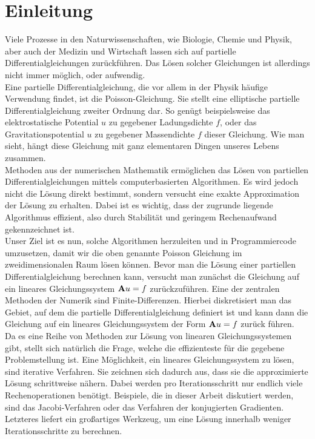\chapter{Einleitung}\label{c.Einleitung}

Viele Prozesse in den Naturwissenschaften, wie Biologie, Chemie und Physik, aber auch der Medizin und Wirtschaft lassen sich auf partielle Differentialgleichungen zurückführen. Das Lösen solcher Gleichungen ist allerdings nicht immer möglich, oder aufwendig. \\
Eine partielle Differentialgleichung, die vor allem in der Physik häufige Verwendung findet, ist die Poisson-Gleichung. Sie stellt eine elliptische partielle Differentialgleichung zweiter Ordnung dar. So genügt beispielsweise das elektrostatische Potential $u$ zu gegebener Ladungsdichte $f$, oder das Gravitationspotential $u$ zu gegebener Massendichte $f$ dieser Gleichung. Wie man sieht, hängt diese Gleichung mit ganz elementaren Dingen unseres Lebens zusammen. \\
Methoden aus der numerischen Mathematik ermöglichen das Lösen von partiellen Differentialgleichungen mittels computerbasierten Algorithmen. Es wird jedoch nicht die Lösung direkt bestimmt, sondern versucht eine exakte Approximation der Lösung zu erhalten. Dabei ist es wichtig, dass der zugrunde liegende Algorithmus effizient, also durch Stabilität und geringem Rechenaufwand gekennzeichnet ist. \\
Unser Ziel ist es nun, solche Algorithmen herzuleiten und in Programmiercode umzusetzen, damit wir die oben genannte Poisson Gleichung im zweidimensionalen Raum lösen können. Bevor man die Lösung einer partiellen Differentialgleichung berechnen kann, versucht man zunächst die Gleichung auf ein lineares Gleichungssystem ${\textbf{A}} u = f$ zurückzuführen. Eine der zentralen Methoden der Numerik sind Finite-Differenzen. Hierbei diskretisiert man das Gebiet, auf dem die partielle Differentialgleichung definiert ist und kann dann die Gleichung auf ein lineares Gleichungssystem der Form ${\textbf{A}} u = f$ zurück führen. \\
Da es eine Reihe von Methoden zur Lösung von linearen Gleichungssystemen gibt, stellt sich natürlich die Frage, welche die effizienteste für die gegebene Problemstellung ist. Eine Möglichkeit, ein lineares Gleichungssystem zu lösen, sind iterative Verfahren. Sie zeichnen sich dadurch aus, dass sie die approximierte Lösung schrittweise nähern. Dabei werden pro Iterationsschritt nur endlich viele Rechenoperationen benötigt. Beispiele, die in dieser Arbeit diskutiert werden, sind das Jacobi-Verfahren oder das Verfahren der konjugierten Gradienten. Letzteres liefert ein großartiges Werkzeug, um eine Lösung innerhalb weniger Iterationsschritte zu berechnen. \\
